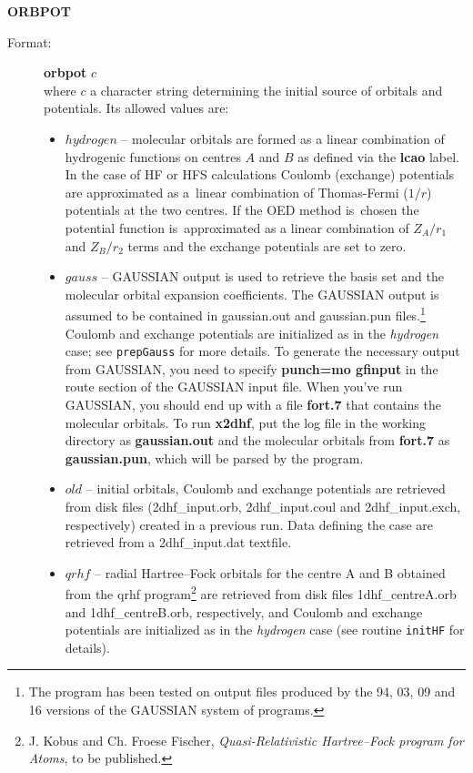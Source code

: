 \documentclass[12pt,a4paper]{article}
\newcommand{\ft}[1]{\texttt{#1}}
\begin{document}
\begin{description}
\item \textbf{ORBPOT}
\begin{description}
\item[Format:] \textbf{orbpot} $c$\\
  where $c$ a character string determining the initial source of
  orbitals and potentials. Its allowed values are:
\begin{itemize}
\item $hydrogen$ -- molecular orbitals are formed as a linear combination of hydrogenic
  functions on centres $A$ and $B$ as defined via the \textbf{lcao} label. In the case of
  HF or HFS calculations Coulomb (exchange) potentials are approximated as a~linear
  combination of Thomas-Fermi ($1/r$) potentials at the two centres. If the OED method
  is~chosen the potential function is~approximated as a linear combination of $Z_A/r_1$
  and $Z_B/r_2$ terms and the exchange potentials are set to zero.

\item $gauss$ -- GAUSSIAN output is used to retrieve the basis set and
  the molecular orbital expansion coefficients. The GAUSSIAN output is
  assumed to be contained in gaussian.out and gaussian.pun
  files.\footnote{The program has been tested on output files produced
    by the 94, 03, 09 and 16 versions of the GAUSSIAN system of
    programs.} Coulomb and exchange potentials are initialized as in
  the \textsl{hydrogen} case; see \ft{prepGauss} for more details.
  To generate the necessary output from GAUSSIAN, you need to specify
  {\bf punch=mo gfinput} in the route section of the GAUSSIAN input
  file. When you've run GAUSSIAN, you should end up with a file {\bf
    fort.7} that contains the molecular orbitals. To run {\bf x2dhf},
  put the log file in the working directory as {\bf gaussian.out} and
  the molecular orbitals from {\bf fort.7} as {\bf gaussian.pun},
  which will be parsed by the program.

\item $old$ -- initial orbitals, Coulomb and exchange potentials are retrieved from disk
  files (2dhf\_\-input.\-orb, 2dhf\_\-input.\-coul and 2dhf\_input.exch, respectively) created in
  a previous run. Data defining the case are retrieved from a 2dhf\_input.\-dat textfile.

\item $qrhf$ -- radial Hartree--Fock orbitals for the centre A and B
  obtained from the qrhf program\footnote{J. Kobus and Ch. Froese
    Fischer, \textsl{Quasi-Relativistic Hartree--Fock program for
      Atoms}, to be published.}  are retrieved from disk files
  1dhf\-\_centreA.\-orb and 1dhf\-\_centreB.\-orb, respectively, and
  Coulomb and exchange potentials are initialized as in the
  \textsl{hydrogen} case (see routine \ft{initHF} for details).


\end{itemize}
\end{description}
\end{description}
\end{document}
